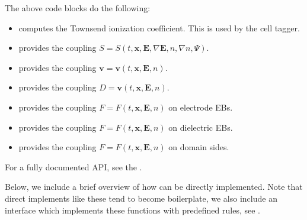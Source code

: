 \documentclass[letterpaper,10pt,english]{sphinxmanual}
\begin{document}
\begin{sphinxVerbatim}[commandchars=\\\{\},formatcom=\scriptsize]
           
\end{sphinxVerbatim}

\sphinxAtStartPar
The above code blocks do the following:
\begin{itemize}
\item {} 
\sphinxAtStartPar
{} computes the Townsend ionization coefficient.
This is used by the cell tagger.

\item {} 
\sphinxAtStartPar
{} provides the coupling \(S = S(t, \mathbf{x}, \mathbf{E}, \nabla\mathbf{E}, n, \nabla n, \Psi)\).

\item {} 
\sphinxAtStartPar
{} provides the coupling \(\mathbf{v} = \mathbf{v}\left(t, \mathbf{x}, \mathbf{E}, n\right)\).

\item {} 
\sphinxAtStartPar
{} provides the coupling \(D = \mathbf{v}\left(t, \mathbf{x}, \mathbf{E}, n\right)\).

\item {} 
\sphinxAtStartPar
{} provides the coupling \(F = F(t, \mathbf{x}, \mathbf{E}, n)\) on electrode EBs.

\item {} 
\sphinxAtStartPar
{} provides the coupling \(F = F(t, \mathbf{x}, \mathbf{E}, n)\) on dielectric EBs.

\item {} 
\sphinxAtStartPar
{} provides the coupling \(F = F(t, \mathbf{x}, \mathbf{E}, n)\) on domain sides.

\end{itemize}

\sphinxAtStartPar
For a fully documented API, see the .

\sphinxAtStartPar
Below, we include a brief overview of how  can be directly implemented.
Note that direct implements like these tend to become boilerplate, we also include an interface which implements these functions with pre\sphinxhyphen{}defined rules, see {\hyperref[\detokenize{Applications/CdrPlasmaModel:chap-cdrplasmajson}]{}}.
\end{document}

